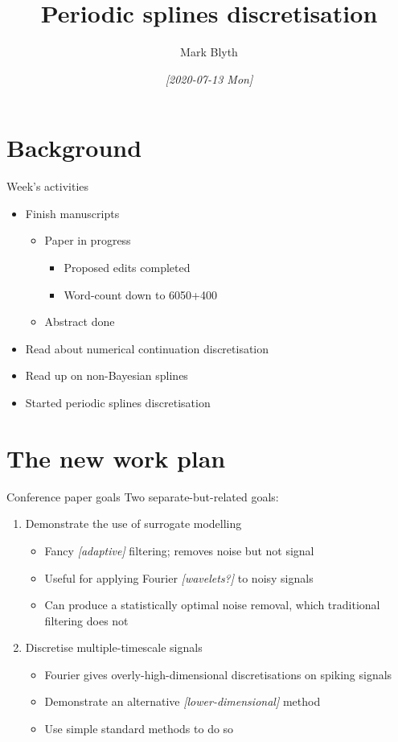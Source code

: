 \documentclass[presentation]{beamer}
\author{Mark Blyth}
\date{\textit{[2020-07-13 Mon]}}
\title{Periodic splines discretisation}
\begin{document}
\maketitle

\section{Background}
\label{sec:org9672594}
\begin{frame}[label={sec:org0d0e1db}]{Week's activities}
\begin{itemize}
\item Finish manuscripts
\begin{itemize}
\item Paper in progress
\begin{itemize}
\item Proposed edits completed
\item Word-count down to 6050+400
\end{itemize}
\item Abstract done
\end{itemize}
\item Read about numerical continuation discretisation
\item Read up on non-Bayesian splines
\item Started periodic splines discretisation
\end{itemize}
\end{frame}

\section{The new work plan}
\label{sec:orgbb37f26}
\begin{frame}[label={sec:orge86ca2c}]{Conference paper goals}
Two separate-but-related goals:
\vfill
\begin{enumerate}[<+->]
\item Demonstrate the use of surrogate modelling
\begin{itemize}
\item Fancy \emph{[adaptive]} filtering; removes noise but not signal
\item Useful for applying Fourier \emph{[wavelets?]} to noisy signals
\item Can produce a statistically optimal noise removal, which traditional filtering does not
\end{itemize}
\item Discretise multiple-timescale signals
\begin{itemize}
\item Fourier gives overly-high-dimensional discretisations on spiking signals
\item Demonstrate an alternative \emph{[lower-dimensional]} method
\item Use simple standard methods to do so
\end{itemize}
\end{enumerate}
\end{frame}
\end{document}
